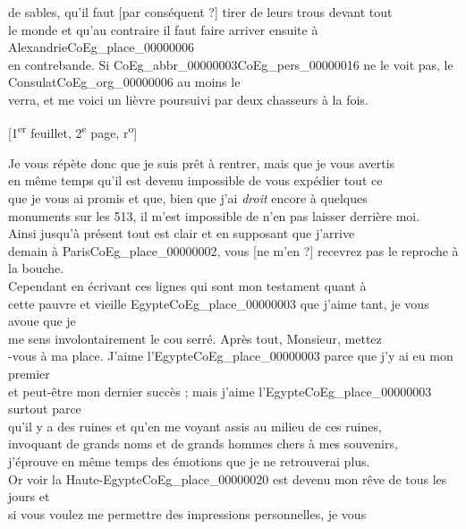 \documentclass{book}
\begin{document}
de sables, qu’il faut {[par conséquent ?]} tirer de leurs trous devant tout\\
le monde et qu’au contraire il faut faire arriver ensuite à Alexandrie\gls{CoEg_place_00000006}\\
en contrebande. Si \gls{CoEg_abbr_00000003}\gls{CoEg_pers_00000016} ne le voit pas, le Consulat\gls{CoEg_org_00000006} au moins le\\
verra, et me voici un lièvre poursuivi par deux chasseurs à la fois.
{\footnotesize\begin{center} {[1\textsuperscript{er} feuillet, 2\textsuperscript{e} page, r\textsuperscript{o}]}\end{center}}
\indent Je vous répète donc que je suis prêt à rentrer, mais que je vous avertis\\
en même temps qu’il est devenu impossible de vous expédier tout ce\\
que je vous ai promis et que, bien que j’ai \textit{droit} encore à quelques\\
monuments sur les 513, il m’est impossible de n’en pas laisser derrière moi.\\
\indent Ainsi jusqu’à présent tout est clair et en supposant que j’arrive\\
demain à Paris\gls{CoEg_place_00000002}, vous {[ne m’en ?]} recevrez pas le reproche à la bouche.\\
\indent Cependant en écrivant ces lignes qui sont mon testament quant à\\
cette pauvre et vieille Egypte\gls{CoEg_place_00000003} que j’aime tant, je vous avoue que je\\
me sens involontairement le cou serré. Après tout, Monsieur, mettez\\
-vous à ma place. J’aime l’Egypte\gls{CoEg_place_00000003} parce que j’y ai eu mon premier\\
et peut-être mon dernier succès ; mais j’aime l’Egypte\gls{CoEg_place_00000003} surtout parce\\
qu’il y a des ruines et qu’en me voyant assis au milieu de ces ruines,\\
invoquant de grands noms et de grands hommes chers à mes souvenirs,\\
j’éprouve en même temps des émotions que je ne retrouverai plus.\\
Or voir la Haute-Egypte\gls{CoEg_place_00000020} est devenu mon rêve de tous les jours et\\
si vous voulez me permettre des impressions personnelles, je vous\\
\end{document}
